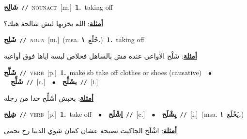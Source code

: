 \documentclass[10pt,a4paper,twoside]{article} %
\begin{document}
\begin{multicols}{2}
{\setlength\topsep{0pt}\textbf{\foreignlanguage{arabic}{شَالِح}}\ {\color{gray}\texttt{//}\color{black}}\ \textsc{noun\textunderscore act}\ [m.]\ \textbf{1.}~taking off\  \begin{flushright}\color{gray}\foreignlanguage{arabic}{\textbf{\underline{\foreignlanguage{arabic}{أمثلة}}}: الله بخزبها ليش شالحة هيك؟}\end{flushright}\color{black}} \vspace{2mm}

{\setlength\topsep{0pt}\textbf{\foreignlanguage{arabic}{شَلِح}}\ {\color{gray}\texttt{//}\color{black}}\ \textsc{noun}\ [m.]\ \color{gray}(msa. \foreignlanguage{arabic}{خَلْع}~\foreignlanguage{arabic}{\textbf{١.}})\color{black}\ \textbf{1.}~taking off\  \begin{flushright}\color{gray}\foreignlanguage{arabic}{\textbf{\underline{\foreignlanguage{arabic}{أمثلة}}}: شَلْح الأواعي عنده مش بالساهل فخلاص لبسه اياها فوق أواعيه}\end{flushright}\color{black}} \vspace{2mm}

{\setlength\topsep{0pt}\textbf{\foreignlanguage{arabic}{شَلَّح}}\ {\color{gray}\texttt{//}\color{black}}\ \textsc{verb}\ [p.]\ \textbf{1.}~make sb take off clothes or shoes (causative)\ \ $\bullet$\ \ \setlength\topsep{0pt}\textbf{\foreignlanguage{arabic}{شَلِّح}}\ {\color{gray}\texttt{//}\color{black}}\ [c.]\ \ $\bullet$\ \ \setlength\topsep{0pt}\textbf{\foreignlanguage{arabic}{يشَلِّح}}\ {\color{gray}\texttt{//}\color{black}}\ [i.]\  \begin{flushright}\color{gray}\foreignlanguage{arabic}{\textbf{\underline{\foreignlanguage{arabic}{أمثلة}}}: بحبش أشَلِّح حدا من رجله}\end{flushright}\color{black}} \vspace{2mm}

{\setlength\topsep{0pt}\textbf{\foreignlanguage{arabic}{شِلِح}}\ {\color{gray}\texttt{//}\color{black}}\ \textsc{verb}\ [p.]\ \textbf{1.}~take off\ \ $\bullet$\ \ \setlength\topsep{0pt}\textbf{\foreignlanguage{arabic}{اِشْلَح}}\ {\color{gray}\texttt{//}\color{black}}\ [c.]\ \ $\bullet$\ \ \setlength\topsep{0pt}\textbf{\foreignlanguage{arabic}{يِشْلَح}}\ {\color{gray}\texttt{//}\color{black}}\ [i.]\ \color{gray}(msa. \foreignlanguage{arabic}{يَخْلَع}~\foreignlanguage{arabic}{\textbf{١.}})\color{black}\  \begin{flushright}\color{gray}\foreignlanguage{arabic}{\textbf{\underline{\foreignlanguage{arabic}{أمثلة}}}: اشْلَح الجاكيت نصيحة عشان كمان شوي الدنيا رح تحمى}\end{flushright}\color{black}} \vspace{2mm}


\end{multicols}
\end{document}
